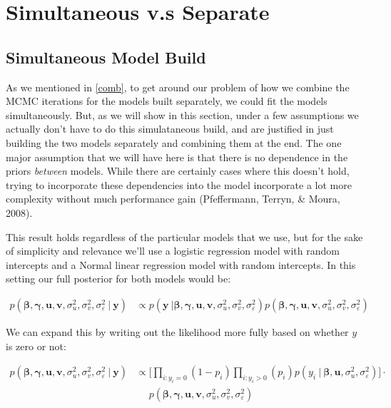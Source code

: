 \documentclass[12pt,twoside]{reedthesis}
\begin{document}
\hypertarget{sepsim}{%
\chapter{Simultaneous v.s Separate}\label{sepsim}}

\hypertarget{simultaneous-model-build}{%
\section{Simultaneous Model Build}\label{simultaneous-model-build}}

As we mentioned in \ref{comb}, to get around our problem of how we combine the MCMC iterations for the models built separately, we could fit the models simultaneously. But, as we will show in this section, under a few assumptions we actually don't have to do this simulataneous build, and are justified in just building the two models separately and combining them at the end. The one major assumption that we will have here is that there is no dependence in the priors \emph{between} models. While there are certainly cases where this doesn't hold, trying to incorporate these dependencies into the model incorporate a lot more complexity without much performance gain (Pfeffermann, Terryn, \& Moura, 2008).

This result holds regardless of the particular models that we use, but for the sake of simplicity and relevance we'll use a logistic regression model with random intercepts and a Normal linear regression model with random intercepts. In this setting our full posterior for both models would be:

\[
\begin{aligned}
p(\boldsymbol{\beta}, \boldsymbol{\gamma}, \mathbf{u}, \mathbf{v}, \sigma_u^2, \sigma_v^2, \sigma_{\varepsilon}^2\ | \ \mathbf{y}) &\propto p(\mathbf{y} \ | \boldsymbol{\beta}, \boldsymbol{\gamma}, \mathbf{u}, \mathbf{v}, \sigma_u^2, \sigma_v^2, \sigma_{\varepsilon}^2)p(\boldsymbol{\beta}, \boldsymbol{\gamma}, \mathbf{u}, \mathbf{v}, \sigma_u^2, \sigma_v^2, \sigma_{\varepsilon}^2) 
\end{aligned}
\]

We can expand this by writing out the likelihood more fully based on whether \(y\) is zero or not:

\[
\begin{aligned}
p(\boldsymbol{\beta}, \boldsymbol{\gamma}, \mathbf{u}, \mathbf{v}, \sigma_u^2, \sigma_v^2, \sigma_{\varepsilon}^2 \ | \ \mathbf{y}) & \propto \bigg[\prod_{i:y_i = 0}(1-p_i)\prod_{i:y_i > 0}(p_i)p(y_i \ | \ \boldsymbol{\beta}, \mathbf{u}, \sigma_u^2, \sigma_{\varepsilon}^2)\bigg]\cdot  \\ & \ \ \ \ \  \ p(\boldsymbol{\beta}, \boldsymbol{\gamma}, \mathbf{u}, \mathbf{v}, \sigma_u^2, \sigma_v^2, \sigma_{\varepsilon}^2)\\
\end{aligned}
\]
\end{document}
